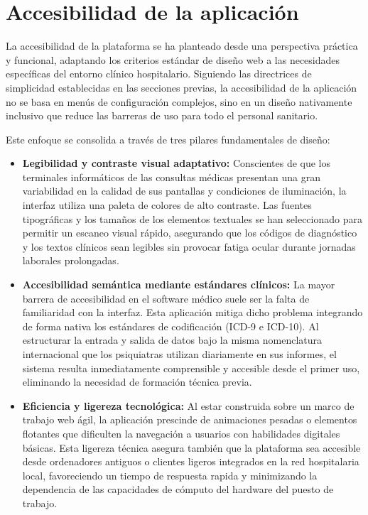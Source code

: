 \documentclass[12pt,a4paper,onecolumn,oneside]{report}
\begin{document}
\section{Accesibilidad de la aplicación}

La accesibilidad de la plataforma se ha planteado desde una perspectiva práctica y funcional, adaptando los criterios estándar de diseño web a las necesidades específicas del entorno clínico hospitalario. Siguiendo las directrices de simplicidad establecidas en las secciones previas, la accesibilidad de la aplicación no se basa en menús de configuración complejos, sino en un diseño nativamente inclusivo que reduce las barreras de uso para todo el personal sanitario.

Este enfoque se consolida a través de tres pilares fundamentales de diseño:

\begin{itemize}
    \item \textbf{Legibilidad y contraste visual adaptativo:} Conscientes de que los terminales informáticos de las consultas médicas presentan una gran variabilidad en la calidad de sus pantallas y condiciones de iluminación, la interfaz utiliza una paleta de colores de alto contraste. Las fuentes tipográficas y los tamaños de los elementos textuales se han seleccionado para permitir un escaneo visual rápido, asegurando que los códigos de diagnóstico y los textos clínicos sean legibles sin provocar fatiga ocular durante jornadas laborales prolongadas.
    
    \item \textbf{Accesibilidad semántica mediante estándares clínicos:} La mayor barrera de accesibilidad en el software médico suele ser la falta de familiaridad con la interfaz. Esta aplicación mitiga dicho problema integrando de forma nativa los estándares de codificación (ICD-9 e ICD-10). Al estructurar la entrada y salida de datos bajo la misma nomenclatura internacional que los psiquiatras utilizan diariamente en sus informes, el sistema resulta inmediatamente comprensible y accesible desde el primer uso, eliminando la necesidad de formación técnica previa.
    
    \item \textbf{Eficiencia y ligereza tecnológica:} Al estar construida sobre un marco de trabajo web ágil, la aplicación prescinde de animaciones pesadas o elementos flotantes que dificulten la navegación a usuarios con habilidades digitales básicas. Esta ligereza técnica asegura también que la plataforma sea accesible desde ordenadores antiguos o clientes ligeros integrados en la red hospitalaria local, favoreciendo un tiempo de respuesta rapida y minimizando la dependencia de las capacidades de cómputo del hardware del puesto de trabajo.
\end{itemize}
\end{document}
